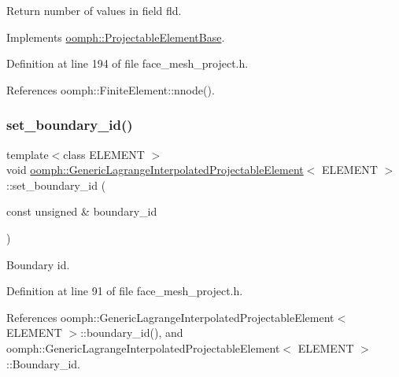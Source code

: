 Return number of values in field fld. 



Implements \hyperlink{classoomph_1_1ProjectableElementBase_a1a9a6de16f3511bca8e8be770abb9c2e}{oomph\+::\+Projectable\+Element\+Base}.



Definition at line 194 of file face\+\_\+mesh\+\_\+project.\+h.



References oomph\+::\+Finite\+Element\+::nnode().

\mbox{\label{classoomph_1_1GenericLagrangeInterpolatedProjectableElement_abf8497b3e3327ec6c0766c8dca09b4c9}} 
\subsubsection{\texorpdfstring{set\+\_\+boundary\+\_\+id()}{set\_boundary\_id()}}
{\footnotesize\ttfamily template$<$class E\+L\+E\+M\+E\+NT $>$ \\
void \hyperlink{classoomph_1_1GenericLagrangeInterpolatedProjectableElement}{oomph\+::\+Generic\+Lagrange\+Interpolated\+Projectable\+Element}$<$ E\+L\+E\+M\+E\+NT $>$\+::set\+\_\+boundary\+\_\+id (\begin{DoxyParamCaption}\item[{const unsigned \&}]{boundary\+\_\+id }\end{DoxyParamCaption})\hspace{0.3cm}{\ttfamily [inline]}}



Boundary id. 



Definition at line 91 of file face\+\_\+mesh\+\_\+project.\+h.



References oomph\+::\+Generic\+Lagrange\+Interpolated\+Projectable\+Element$<$ E\+L\+E\+M\+E\+N\+T $>$\+::boundary\+\_\+id(), and oomph\+::\+Generic\+Lagrange\+Interpolated\+Projectable\+Element$<$ E\+L\+E\+M\+E\+N\+T $>$\+::\+Boundary\+\_\+id.



